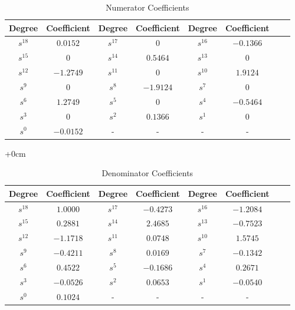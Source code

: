 \documentclass{article}
\begin{document}
\begin{table}[H]
    \centering
    \caption{Numerator Coefficients}
    \begin{tabular}{|c|c|c|c|c|c|c|c|}
        \hline
        \textbf{Degree} & \textbf{Coefficient} & \textbf{Degree} & \textbf{Coefficient} & \textbf{Degree} & \textbf{Coefficient}\\
        \hline
        $s^{18}$ & $0.0152$ & $s^{17}$ & $0$ & $s^{16}$ & $-0.1366$ \\
        \hline
        $s^{15}$ & $0$ & $s^{14}$ & $0.5464$ & $s^{13}$ & $0$ \\
        \hline
        $s^{12}$ & $-1.2749$ & $s^{11}$ & $0$ & $s^{10}$ & $1.9124$ \\
        \hline
        $s^{9}$ & $0$ & $s^{8}$ & $-1.9124$ & $s^{7}$ & $0$ \\
        \hline
        $s^{6}$ & $1.2749$ & $s^{5}$ & $0$ & $s^{4}$ & $-0.5464$ \\
        \hline
        $s^{3}$ & $0$ & $s^{2}$ & $0.1366$ & $s^{1}$ & $0$ \\
        \hline
        $s^{0}$ & $-0.0152$ & - & - & - & - \\
        \hline
    \end{tabular}
\end{table}


\begin{table}[H]
    \centering
    \begin{adjustwidth}{+0cm}{}
    \caption{Denominator Coefficients}
    \begin{tabular}{|c|c|c|c|c|c|c|c|}
        \hline
        Degree & Coefficient & Degree & Coefficient & Degree & Coefficient\\
        \hline
        $s^{18}$ & $1.0000$ & $s^{17}$ & $-0.4273$ & $s^{16}$ & $-1.2084$ \\
        \hline
        $s^{15}$ & $0.2881$ & $s^{14}$ & $2.4685$ & $s^{13}$ & $-0.7523$ \\
        \hline
        $s^{12}$ & $-1.1718$ & $s^{11}$ & $0.0748$ & $s^{10}$ & $1.5745$ \\
        \hline
        $s^{9}$ & $-0.4211$ & $s^{8}$ & $0.0169$ & $s^{7}$ & $-0.1342$ \\
        \hline
        $s^{6}$ & $0.4522$ & $s^{5}$ & $-0.1686$ & $s^{4}$ & $0.2671$ \\
        \hline
        $s^{3}$ & $-0.0526$ & $s^{2}$ & $0.0653$ & $s^{1}$ & $-0.0540$ \\
        \hline
        $s^{0}$ & $0.1024$ & - & - & - & - \\
        \hline
\end{tabular}
\end{adjustwidth}
\end{table}
\end{document}
